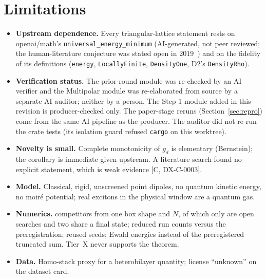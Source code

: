 \documentclass[11pt]{article}
\theoremstyle{remark}
\newcommand{\tier}[1]{\textsf{[#1]}}
\newcommand{\lean}[1]{\texttt{#1}}
\begin{document}
\section{Limitations}\label{sec:lim}
\begin{itemize}
\item \textbf{Upstream dependence.} Every triangular-lattice statement rests on openai/math's
\lean{universal\_energy\_minimum} (AI-generated, not peer reviewed; the human-literature conjecture was stated open in
2019~\cite{ps}) and on the
fidelity of its definitions (\lean{energy}, \lean{LocallyFinite}, \lean{DensityOne}, D2's \lean{DensityRho}).
\item \textbf{Verification status.} The prior-round module was re-checked by an AI verifier and the Multipolar module
was re-elaborated from source by a separate AI auditor; neither by a person. The Step-1 module added in this revision
is producer-checked only. The paper-stage reruns (Section~\ref{sec:repro}) come from the same AI pipeline as the
producer. The auditor did not re-run the crate tests (its isolation guard refused \texttt{cargo} on this worktree).
\item \textbf{Novelty is small.} Complete monotonicity of $g_d$ is elementary (Bernstein); the corollary is immediate
given upstream. A literature search found no explicit statement, which is weak evidence \tier{C, DX-C-0003}.
\item \textbf{Model.} Classical, rigid, unscreened point dipoles, no quantum kinetic energy, no moir\'e potential; real
excitons in the physical window are a quantum gas.
\item \textbf{Numerics.} \DXNComp{} competitors from one box shape and $N$, of which only \DXNOpen{} are open searches
and two share a final state; reduced run counts versus the preregistration; reused seeds; Ewald energies instead of the
preregistered truncated sum. Tier~X never supports the theorem.
\item \textbf{Data.} Homo-stack proxy for a heterobilayer quantity; license ``unknown'' on the dataset card.
\end{itemize}
\end{document}
